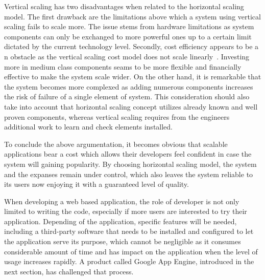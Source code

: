 Vertical scaling has two disadvantages when related to the horizontal scaling model. The first drawback are the limitations above which a system using vertical scaling fails to scale more. The issue stems from hardware limitations as system components can only be exchanged to more powerful ones up to a certain limit dictated by the current technology level. Secondly, cost efficiency appears to be a n obstacle as the vertical scaling cost model does not scale linearly~\cite[page 204]{build_scalable}. Investing more in medium class components seams to be more flexible and financially effective to make the system scale wider. On the other hand, it is remarkable that the system becomes more complexed as adding numerous components increases the risk of failure of a single element of system. This consideration should also take into account that horizontal scaling concept utilizes already known and well proven components, whereas vertical scaling requires from the engineers additional work to learn and check elements installed.

To conclude the above argumentation, it becomes obvious that scalable applications bear a cost which allows their developers feel confident in case the system will gaining popularity. By choosing horizontal scaling model, the system and the expanses remain under control, which also leaves the system reliable to its users now enjoying it with a guaranteed level of quality. 

When developing a web based application, the role of developer is not only limited to writing the code, especially if more users are interested to try their application. Depending of the application, specific features will be needed, including a third-party software that needs to be installed and configured to let the application serve its purpose, which cannot be negligible as it consumes considerable amount of time and has impact on the application when the level of usage increases rapidly. A product called Google App Engine, introduced in the next section, has challenged that process.  
 
